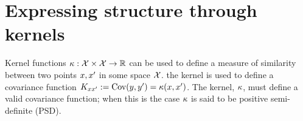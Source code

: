 \documentclass[twoside]{article}
\begin{document}




\section{Expressing structure through kernels}

Kernel functions $\kappa : \mathcal{X} \times \mathcal{X} \to \mathbb{R}$ can be used to define a measure of similarity between two points $x, x'$ in some space $\mathcal{X}$.
 the kernel is used to define a covariance function ${K_{x x'} := \textrm{Cov}(y, y') = \kappa(x,x')}$.
The kernel, $\kappa$, must define a valid covariance function; when this is the case $\kappa$ is said to be positive semi-definite (PSD).
\end{document}
